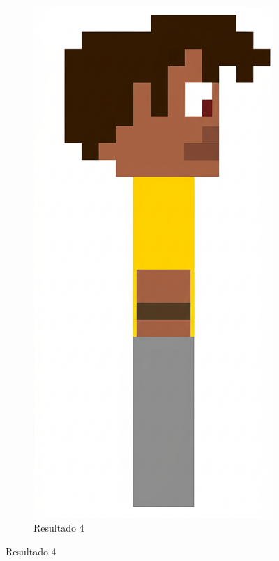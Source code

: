 \begin{figure}[htbp]
\begin{subfigure}{0.23\linewidth}
        \includegraphics[width=1\linewidth]{figs/geminiPro/chat2/res4_tela2.png}
        \caption{\small Resultado 4}
        \label{fig:geminiPro5d}
    \end{subfigure}
\end{figure}

